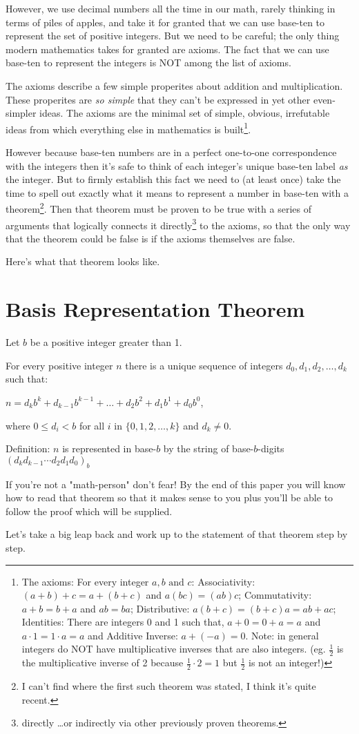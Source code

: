 \documentclass{article}
\newenvironment{jprIn}{\begin{adjustwidth}{2em}{}}{\end{adjustwidth}}
\begin{document}
However, we use decimal numbers all the time in our math,
rarely thinking in terms of piles of apples,
and take it for granted
that we can use base-ten to represent the set of positive integers.
But we need to be careful; the only thing modern mathematics takes for granted are axioms.
The fact that we can use base-ten to represent the integers is NOT among the list of axioms.

The axioms describe a few simple properites about addition and multiplication.
These properites are \emph{so simple} that they can't be expressed in
yet other even-simpler ideas. The axioms are the minimal set of simple,
obvious, irrefutable ideas from which
everything else in mathematics is built\footnote{The axioms:
For every integer $a,b\text{ and }c$:
Associativity: $(a+b)+c=a+(b+c)$ and $a(bc)=(ab)c$;
Commutativity: $a+b=b+a$ and $ab=ba$;
Distributive: $a(b+c)=(b+c)a=ab+ac$;
Identities: There are integers 0 and 1 such that,
$a+0=0+a=a$ and $a\cdot{}1=1\cdot{}a=a$ and
Additive Inverse: $a+(-a)=0$.
Note: in general integers do NOT have multiplicative inverses 
that are also integers. (eg. $\frac{1}{2}$ is the multiplicative
inverse of 2 because $\frac{1}{2}\cdot{}2=1$ but $\frac{1}{2}$ is not an integer!)}.

However because base-ten numbers are in
a perfect one-to-one correspondence with the integers then
it's safe to think of each
integer's unique base-ten label \emph{as} the integer.
But to firmly establish this fact we need to (at least once) take the time to
spell out exactly what it means to represent a number in base-ten with a theorem\footnote{I can't find where
the first such theorem was stated, I think it's quite recent.}. Then that theorem must be proven to
be true with a series of arguments that logically connects it
directly\footnote{directly \dots{}or indirectly
via other previously proven theorems.} to the axioms, so that the only way
that the theorem could be false is if the axioms themselves are false.

Here's what that theorem looks like.

\section*{Basis Representation Theorem}
\begin{jprIn}
Let $b$ be a positive integer greater than 1.

For every positive integer $n$ there is a unique sequence
of integers $d_0, d_1, d_2,\dots{},d_k$ such that:

\hspace{3em}$n=d_kb^k+d_{k-1}b^{k-1}+\dots+d_2b^2+d_1b^1+d_0b^0$,

where $0\le{}d_i<b$ for all $i$ in $\{0,1,2,\dots{},k\}$ and $d_k\ne0$.

Definition: $n$ is represented in base-$b$ by the string
of base-$b$-digits $(d_kd_{k-1}{\cdots}d_2d_1d_0)_b$
\end{jprIn}
\bigskip

If you're not a "math-person" don't fear!
By the end of this paper you will know how to read that theorem so that it makes sense to you
plus you'll be able to follow the proof which will be supplied.

Let's take a big leap back and work up to the statement of that theorem step by step.
\end{document}
